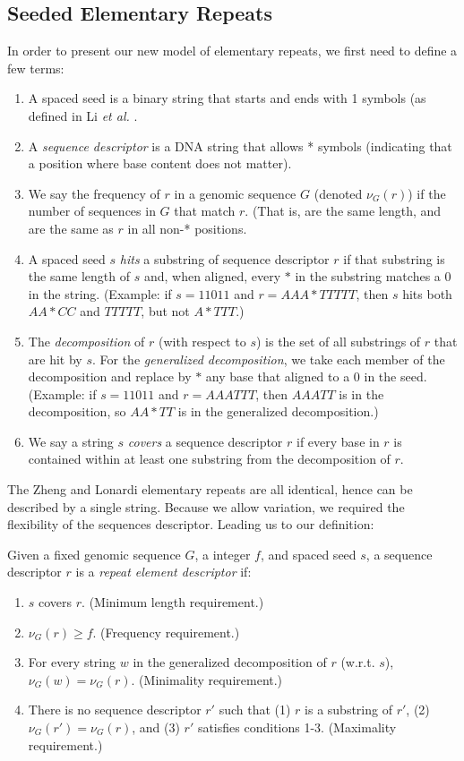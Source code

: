 \documentclass{bmcart}
\begin{document}
\subsection*{Seeded Elementary Repeats}
In order to present our new model of elementary repeats, we first need
to define a few terms:
\begin{enumerate}
  \item A spaced seed is a binary string that starts and ends with 1
    symbols (as defined in Li {\it et al.} \cite{Li:2004wl}.
  \item A {\it sequence descriptor} is a DNA string that allows *
    symbols (indicating that a position where base content does not
    matter).
  \item We say the frequency of $r$ in a genomic sequence $G$ (denoted
    $\nu_G(r)$) if the number of sequences in $G$ that match $r$.
    (That is, are the same length, and are the same as $r$ in all
    non-* positions.
  \item A spaced seed $s$ {\it hits} a substring of sequence
    descriptor $r$ if that substring is the same length of $s$ and,
    when aligned, every $*$ in the substring matches a 0 in the
    string.  (Example: if $s=11011$ and $r=AAA*TTTTT$, then $s$
    hits both $AA*CC$ and $TTTTT$, but not $A*TTT$.)
  \item The {\it decomposition} of $r$ (with respect to $s$) is the set of all substrings of
    $r$ that are hit by $s$.  For the {\it generalized decomposition},
    we take each member of the decomposition and replace by $*$ any
    base that aligned to a 0 in the seed.  (Example: if $s=11011$ and
    $r=AAATTT$, then $AAATT$ is in the decomposition, so $AA*TT$ is in
    the generalized decomposition.)
  \item We say a string $s$ {\it covers} a sequence descriptor $r$ if
  every base in $r$ is contained within at least one substring from
  the decomposition of $r$.
\end{enumerate}

The Zheng and Lonardi elementary repeats are all identical, hence can
be described by a single string.  Because we allow variation, we
required the flexibility of the sequences descriptor.  Leading us to
our definition:

\begin{definition}
  \label{REDDef}
  Given a fixed genomic sequence $G$, a integer $f$, and spaced seed $s$, a sequence
  descriptor $r$ is a {\it repeat element descriptor} if:
  \begin{enumerate}
  \item $s$ covers $r$.  (Minimum length requirement.)
  \item $\nu_G(r) \geq f$.  (Frequency requirement.)
  \item For every string $w$ in the generalized decomposition of $r$
    (w.r.t. $s$), $\nu_G(w) = \nu_G(r)$.  (Minimality requirement.)
  \item There is no sequence descriptor $r'$ such that (1) $r$ is
    a substring of $r'$, (2) $\nu_G(r') = \nu_G(r)$, and (3) $r'$
    satisfies conditions 1-3.  (Maximality requirement.)
  \end{enumerate}
\end{definition}
\end{document}
